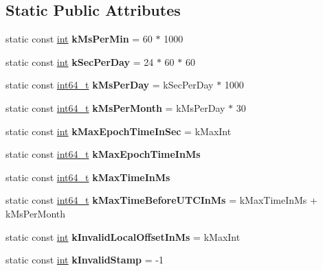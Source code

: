 \subsection*{Static Public Attributes}
\begin{DoxyCompactItemize}
\item 
\mbox{\label{classv8_1_1internal_1_1DateCache_a3c761028d118de4a4d1e48b61cf4d349}} 
static const \mbox{\hyperlink{classint}{int}} {\bfseries k\+Ms\+Per\+Min} = 60 $\ast$ 1000
\item 
\mbox{\label{classv8_1_1internal_1_1DateCache_a79dad318641797f0763f3ec7c29f206f}} 
static const \mbox{\hyperlink{classint}{int}} {\bfseries k\+Sec\+Per\+Day} = 24 $\ast$ 60 $\ast$ 60
\item 
\mbox{\label{classv8_1_1internal_1_1DateCache_aba1f60dee0b7f7d1b7e0b99323e6d613}} 
static const \mbox{\hyperlink{classint64__t}{int64\+\_\+t}} {\bfseries k\+Ms\+Per\+Day} = k\+Sec\+Per\+Day $\ast$ 1000
\item 
\mbox{\label{classv8_1_1internal_1_1DateCache_a7b74095e6e7cae1dcef2023a067ca25a}} 
static const \mbox{\hyperlink{classint64__t}{int64\+\_\+t}} {\bfseries k\+Ms\+Per\+Month} = k\+Ms\+Per\+Day $\ast$ 30
\item 
\mbox{\label{classv8_1_1internal_1_1DateCache_a9b0e9e5f19fd9e849462123954e0557d}} 
static const \mbox{\hyperlink{classint}{int}} {\bfseries k\+Max\+Epoch\+Time\+In\+Sec} = k\+Max\+Int
\item 
static const \mbox{\hyperlink{classint64__t}{int64\+\_\+t}} {\bfseries k\+Max\+Epoch\+Time\+In\+Ms}
\item 
static const \mbox{\hyperlink{classint64__t}{int64\+\_\+t}} {\bfseries k\+Max\+Time\+In\+Ms}
\item 
\mbox{\label{classv8_1_1internal_1_1DateCache_aeda61b9cbafe90e99870516c0ce10bcc}} 
static const \mbox{\hyperlink{classint64__t}{int64\+\_\+t}} {\bfseries k\+Max\+Time\+Before\+U\+T\+C\+In\+Ms} = k\+Max\+Time\+In\+Ms + k\+Ms\+Per\+Month
\item 
\mbox{\label{classv8_1_1internal_1_1DateCache_ab1f3dcb4895b2e277589cce9d025c104}} 
static const \mbox{\hyperlink{classint}{int}} {\bfseries k\+Invalid\+Local\+Offset\+In\+Ms} = k\+Max\+Int
\item 
\mbox{\label{classv8_1_1internal_1_1DateCache_a672aa540aa45bd02ac9eea74a1536841}} 
static const \mbox{\hyperlink{classint}{int}} {\bfseries k\+Invalid\+Stamp} = -\/1
\end{DoxyCompactItemize}



